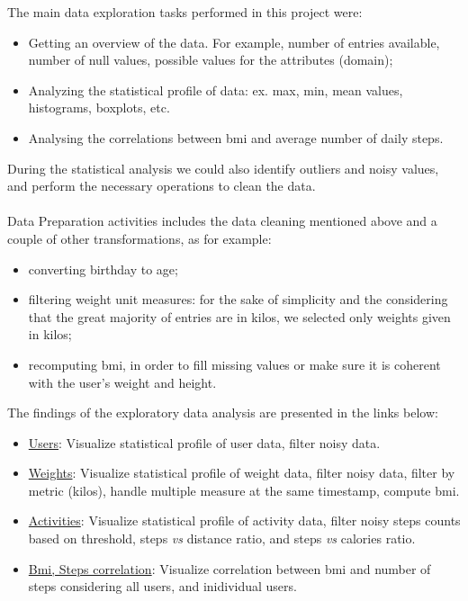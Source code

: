 \documentclass[12pt]{iopart}
\begin{document}
The main data exploration  tasks performed in this project were:
\begin{itemize}
\item Getting an overview of the data. For example, number of entries available, number of null values, possible values for the attributes (domain);
\item Analyzing the statistical profile of data: ex. max, min, mean values, histograms, boxplots, etc.
\item Analysing the correlations between bmi and average number of daily steps.
\end{itemize}
During the  statistical analysis we could also identify outliers and noisy values, and perform the necessary operations to clean the data. \\ \\
Data Preparation activities includes the data cleaning mentioned above and a couple of other transformations, as for example: 
\begin{itemize}
\item converting birthday to age;
\item filtering weight unit measures: for the sake of simplicity and the considering that the great majority of entries are in kilos, we selected only weights given in kilos;
\item recomputing bmi, in order to fill missing values or make sure it is coherent with the user's weight and height.
\end{itemize}

The findings of the exploratory data analysis are presented in the links below:

\begin{itemize}
\item  \href{http://htmlpreview.github.io/?https://github.com/renatalucia/activity-tracker/blob/master/data_exploration/users_filter.html}{Users}: Visualize statistical profile of user data, filter noisy data.
 
 
\item  \href{http://htmlpreview.github.io/?https://github.com/renatalucia/activity-tracker/blob/master/data_exploration/weights_filter.html}{Weights}: Visualize statistical profile of weight data, filter noisy data, filter by metric (kilos), handle multiple measure at the same timestamp, compute bmi.

\item  \href{http://htmlpreview.github.io/?https://github.com/renatalucia/activity-tracker/blob/master/data_exploration/tracker_filter.html}{Activities}: Visualize statistical profile of activity data, filter noisy steps counts based on threshold, steps \textit{vs} distance ratio, and steps \textit{vs} calories ratio.

\item  \href{http://htmlpreview.github.io/?https://github.com/renatalucia/activity-tracker/blob/master/data_exploration/bmi_steps_correlation.html}{Bmi, Steps correlation}: Visualize correlation between bmi and number of steps considering all users, and inidividual users.
\end{itemize}
\end{document}

